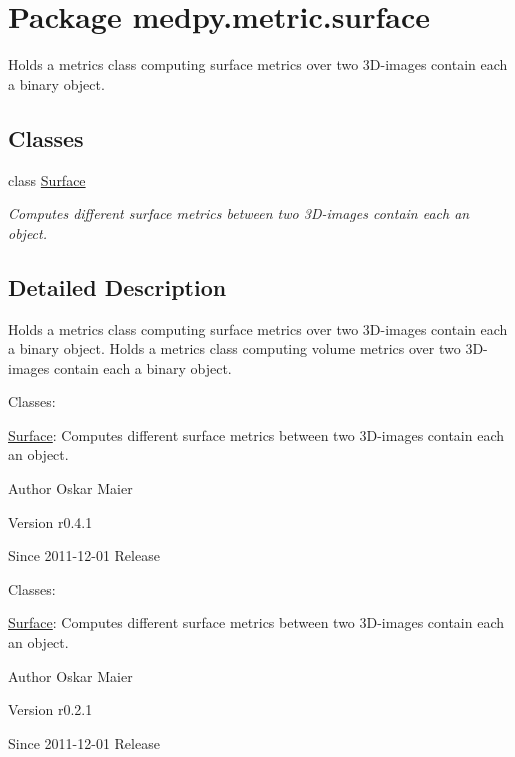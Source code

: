 \hypertarget{namespacemedpy_1_1metric_1_1surface}{
\section{Package medpy.metric.surface}
\label{namespacemedpy_1_1metric_1_1surface}
}


Holds a metrics class computing surface metrics over two 3D-\/images contain each a binary object.  


\subsection*{Classes}
\begin{DoxyCompactItemize}
\item 
class \hyperlink{classmedpy_1_1metric_1_1surface_1_1Surface}{Surface}
\begin{DoxyCompactList}\small\item\em Computes different surface metrics between two 3D-\/images contain each an object. \end{DoxyCompactList}\end{DoxyCompactItemize}


\subsection{Detailed Description}
Holds a metrics class computing surface metrics over two 3D-\/images contain each a binary object. Holds a metrics class computing volume metrics over two 3D-\/images contain each a binary object.

Classes:
\begin{DoxyItemize}
\item \hyperlink{classmedpy_1_1metric_1_1surface_1_1Surface}{Surface}: Computes different surface metrics between two 3D-\/images contain each an object.
\end{DoxyItemize}

\begin{DoxyAuthor}{Author}
Oskar Maier 
\end{DoxyAuthor}
\begin{DoxyVersion}{Version}
r0.4.1 
\end{DoxyVersion}
\begin{DoxySince}{Since}
2011-\/12-\/01  Release
\end{DoxySince}
Classes:
\begin{DoxyItemize}
\item \hyperlink{classmedpy_1_1metric_1_1surface_1_1Surface}{Surface}: Computes different surface metrics between two 3D-\/images contain each an object.
\end{DoxyItemize}

\begin{DoxyAuthor}{Author}
Oskar Maier 
\end{DoxyAuthor}
\begin{DoxyVersion}{Version}
r0.2.1 
\end{DoxyVersion}
\begin{DoxySince}{Since}
2011-\/12-\/01  Release 
\end{DoxySince}
